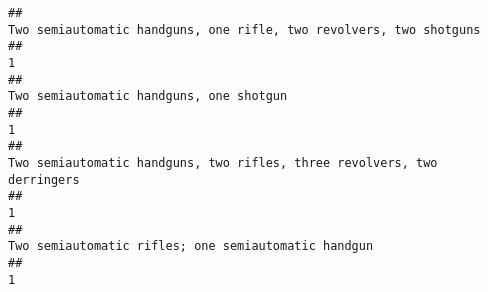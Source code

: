 \documentclass[
]{article}
\begin{document}
\begin{verbatim}
##                                                                                                                                                                                                                                                                                                                                    Two semiautomatic handguns, one rifle, two revolvers, two shotguns 
##                                                                                                                                                                                                                                                                                                                                                                                                     1 
##                                                                                                                                                                                                                                                                                                                                                               Two semiautomatic handguns, one shotgun 
##                                                                                                                                                                                                                                                                                                                                                                                                     1 
##                                                                                                                                                                                                                                                                                                                               Two semiautomatic handguns, two rifles, three revolvers, two derringers 
##                                                                                                                                                                                                                                                                                                                                                                                                     1 
##                                                                                                                                                                                                                                                                                                                                                   Two semiautomatic rifles; one semiautomatic handgun 
##                                                                                                                                                                                                                                                                                                                                                                                                     1
\end{verbatim}
\end{document}
